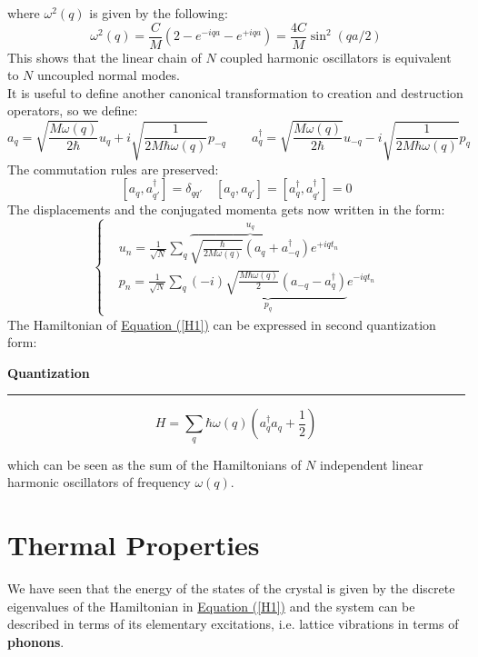 \documentclass[10.75pt,a4paper,openright,bottom=2cm]{article}
\newcommand{\RN}[1]{%
  \textup{\uppercase\expandafter{\romannumeral#1}}%
}
\begin{document}
where $\omega^2(q)$ is given by the following:
\[
\omega^2(q)=\frac{C}{M}(2-e^{-iqa}-e^{+iqa})=\frac{4C}{M}\sin^2(qa/2)
\]
This shows that the linear chain of $N$ coupled harmonic oscillators is equivalent to $N$ uncoupled normal modes.\\
It is useful to define another canonical transformation to creation and destruction operators, so we define:
\[
a_q=\sqrt{\frac{M\omega(q)}{2\hbar}}u_q+i\sqrt{\frac{1}{2M\hbar\omega(q)}}p_{-q} \qquad a_q^\dagger=\sqrt{\frac{M\omega(q)}{2\hbar}}u_{-q}-i\sqrt{\frac{1}{2M\hbar\omega(q)}}p_q
\]
The commutation rules are preserved:
\[
[a_q,a_{q'}^\dagger]=\delta_{qq'} \quad [a_q,a_{q'}]=[a_q^\dagger,a_{q'}^\dagger]=0
\]
The displacements and the conjugated momenta gets now written in the form:
\[
\left\{
\begin{aligned}
&u_n=\frac{1}{\sqrt{N}}\sum_q\overbrace{\sqrt{\frac{\hbar}{2M\omega(q)}}(a_q+a_{-q}^\dagger)}^{u_q}e^{+iqt_n}\\
&p_n=\frac{1}{\sqrt{N}}\sum_q\underbrace{(-i)\sqrt{\frac{M\hbar\omega(q)}{2}}(a_{-q}-a_q^\dagger)}_{p_q}e^{-iqt_n}
\end{aligned}
\right.
\]
The Hamiltonian of \hyperref[H1]{Equation (\ref{H1})} can be expressed in second quantization form:
\begin{mybox}
\textbf{\RN{2} Quantization{\color{blue!30}{g}}}
\hrule
\vspace{0.2cm}
\[
H=\sum_q\hbar\omega(q)\left(a_q^\dagger a_q+\frac{1}{2}\right)
\]
\end{mybox}\noindent
which can be seen as the sum of the Hamiltonians of $N$ independent linear harmonic oscillators of frequency $\omega(q)$.
\newpage
\section{Thermal Properties}
We have seen that the energy of the states of the crystal is given by the discrete eigenvalues of the Hamiltonian in \hyperref[H1]{Equation (\ref{H1})} and the system can be described in terms of its elementary excitations, i.e. lattice vibrations in terms of \textbf{phonons}.
\end{document}

